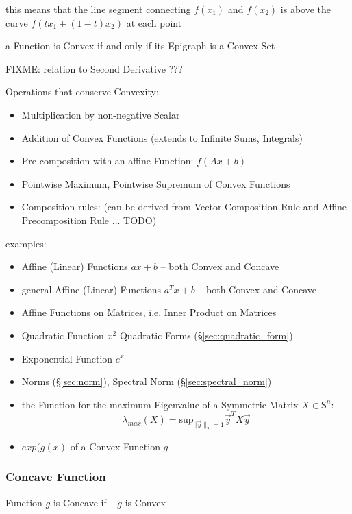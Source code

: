 this means that the line segment connecting $f(x_1)$ and $f(x_2)$ is above the
curve $f(tx_1 + (1-t)x_2)$ at each point

a Function is Convex if and only if its Epigraph is a Convex Set

FIXME: relation to Second Derivative ???

Operations that conserve Convexity:
\begin{itemize}
  \item Multiplication by non-negative Scalar
  \item Addition of Convex Functions (extends to Infinite Sums, Integrals)
  \item Pre-composition with an affine Function: $f(Ax + b)$
  \item Pointwise Maximum, Pointwise Supremum of Convex Functions
  \item Composition rules: (can be derived from Vector Composition Rule and
    Affine Precomposition Rule ... TODO)
\end{itemize}

examples:
\begin{itemize}
  \item Affine (Linear) Functions $ax + b$ -- both Convex and Concave
  \item general Affine (Linear) Functions $a^T x + b$ -- both Convex and Concave
  \item Affine Functions on Matrices, i.e. Inner Product on Matrices
  \item Quadratic Function $x^2$ \fist Quadratic Forms
    (\S\ref{sec:quadratic_form})
  \item Exponential Function $e^x$
  \item Norms (\S\ref{sec:norm}), Spectral Norm (\S\ref{sec:spectral_norm})
  \item the Function for the maximum Eigenvalue of a Symmetric Matrix $X \in
    \mathsf{S}^n$:
    \[
      \lambda_{max}(X) = \mathrm{sup}_{\ |\vec{y}\|_2=1} \vec{y}^T X \vec{y}
    \]
  \item $exp (g(x)$ of a Convex Function $g$
\end{itemize}



\subsubsection{Concave Function}\label{sec:concave_function}

Function $g$ is Concave if $-g$ is Convex

